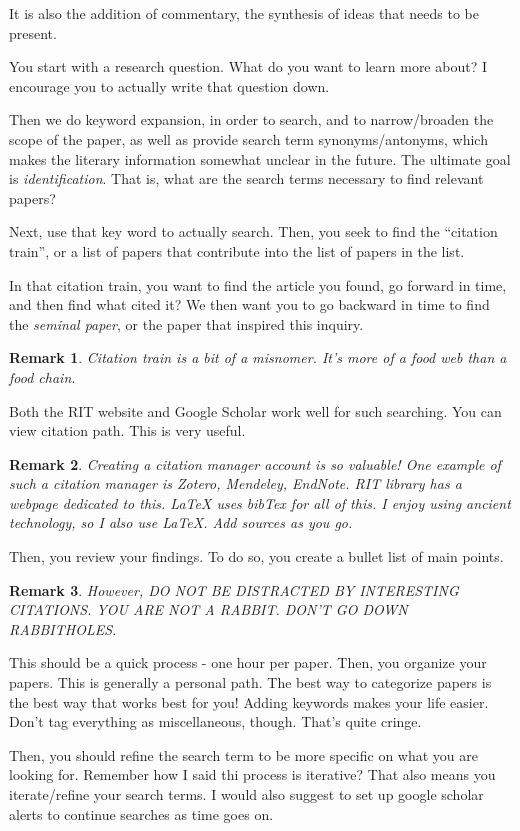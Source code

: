 \documentclass[10pt, oneside]{article}
\newtheorem{rem}{Remark}
\begin{document}
It is also the addition of commentary, the synthesis of ideas that needs to be present.


You start with a research question. What do you want to learn more about? I encourage you to actually write that question down.

Then we do keyword expansion, in order to search, and to narrow/broaden the scope of the paper, as well as provide search term synonyms/antonyms, which makes the literary information somewhat unclear in the future. The ultimate goal is \textit{identification}. That is, what are the search terms necessary to find relevant papers? 

Next, use that key word to actually search. Then, you seek to find the ``citation train'', or a list of papers that contribute into the list of papers in the list. 

In that citation train, you want to find the article you found, go forward in time, and then find what cited it? We then want you to go backward in time to find the \textit{seminal paper}, or the paper that inspired this inquiry.

\begin{rem}
Citation train is a bit of a misnomer. It's more of a food web than a food chain.
\end{rem}

Both the RIT website and Google Scholar work well for such searching. You can view citation path. This is very useful. 

\begin{rem}
Creating a citation manager account is so valuable! One example of such a citation manager is Zotero, Mendeley, EndNote. RIT library has a webpage dedicated to this. LaTeX uses bibTex for all of this. I enjoy using ancient technology, so I also use LaTeX. Add sources as you go. 
\end{rem}

Then, you review your findings. To do so, you create a bullet list of main points. 
\begin{rem}
However, DO NOT BE DISTRACTED BY INTERESTING CITATIONS. YOU ARE NOT A RABBIT. DON'T GO DOWN RABBITHOLES. 
\end{rem}
This should be a quick process - one hour per paper. Then, you organize your papers. This is generally a personal path. The best way to categorize papers is the best way that works best for you! Adding keywords makes your life easier. Don't tag everything as miscellaneous, though. That's quite cringe. 

Then, you should refine the search term to be more specific on what you are looking for. Remember how I said thi process is iterative? That also means you iterate/refine your search terms. I would also suggest to set up google scholar alerts to continue searches as time goes on. 
\end{document}
